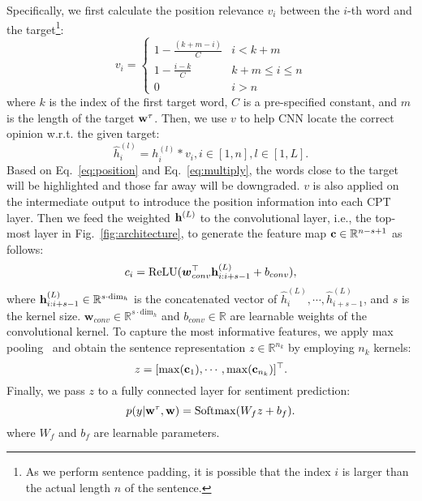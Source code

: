 \documentclass[11pt,a4paper]{article}
\begin{document}
Specifically, we first calculate the position relevance $v_i$ between the $i$-th word and the target\footnote{As we perform sentence padding, it is possible that the index $i$ is larger than the actual length $n$ of the sentence.}:
\begin{equation}
\label{eq:position}
v_i=
\begin{cases} 
      1-\frac{(k+m-i)}{C} & i < k+m \\
      1-\frac{i-k}{C} & k+m\leq i\leq n \\
      0 & i > n
\end{cases}
\end{equation}
where $k$ is the index of the first target word, $C$ is a pre-specified constant, and $m$ is the length of the target $\mathrm{\bf w}^\tau$. Then, we use $v$ to help CNN locate the correct opinion w.r.t. the given target:
\begin{equation}
\label{eq:multiply}
    \hat{h}^{(l)}_i = h^{(l)}_i * v_i, i \in [1,n], l \in [1,L].
\end{equation}
Based on Eq.~\ref{eq:position} and Eq.~\ref{eq:multiply}, the words close to the target will be highlighted and those far away will be downgraded. $v$ is also applied on the intermediate output to introduce the position information into each CPT layer. Then we feed the weighted $\mathrm{\bf h}^{(L)}$ to the convolutional layer, i.e., the top-most layer in Fig.~\ref{fig:architecture}, to generate the feature map $\mathrm{\bf c} \in \mathbb{R}^{n-s+1}$ as follows:
\begin{equation}
    c_i = \mathrm{ReLU}(\boldsymbol{w}^{\top}_{conv}  \mathrm{\bf h}^{(L)}_{i:i+s-1} + b_{conv}),
\end{equation}
where $\mathrm{\bf h}^{(L)}_{i:i+s-1} \in \mathbb{R}^{s \cdot \mathrm{dim}_h}$ is the concatenated vector of $\hat{h}^{(L)}_i,\cdots,\hat{h}^{(L)}_{i+s-1}$, and $s$ is the kernel size. $\boldsymbol{w}_{conv} \in \mathbb{R}^{s \cdot \mathrm{dim}_h} $ and $b_{conv} \in \mathbb{R}$ are learnable weights of the convolutional kernel. To capture the most informative features, we apply max pooling~\cite{kim:2014:EMNLP2014} and obtain the sentence representation $z \in \mathbb{R}^{n_k}$ by employing $n_k$ kernels:
\begin{equation}
    z = [\mathrm{max}(\mathrm{\bf c}_1), \cdots, \mathrm{max}(\mathrm{\bf c}_{n_k})] ^ {\top}.
\end{equation}
Finally, we pass $z$ to a fully connected layer for sentiment prediction:
\begin{equation}
    p(y|\mathrm{\bf w}^\tau,\mathrm{\bf w}) = \mathrm{Softmax}(W_{f} z + b_{f}).
\end{equation}
where $W_f$ and $b_f$ are learnable parameters.
\end{document}
